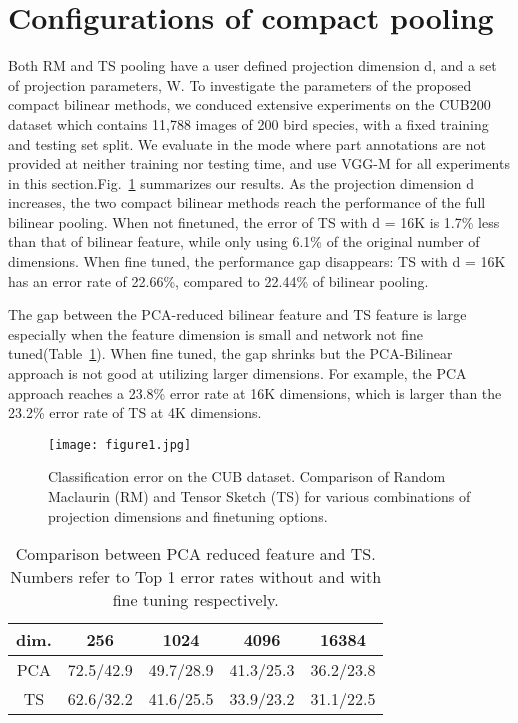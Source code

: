 \documentclass[10pt,twocolumn,letterpaper]{article}
\begin{document}
\section{ Configurations of compact pooling}
Both RM and TS pooling have a user defined projection dimension d, and a set of projection parameters, W. To investigate the parameters of the proposed compact bilinear methods, we conduced extensive experiments on the CUB200 dataset which contains 11,788 images of 200 bird
species, with a fixed training and testing set split. We evaluate in the mode where part annotations are not provided at neither training nor testing time, and use VGG-M for all
experiments in this section.Fig.~\ref{pic1} summarizes our results. As the projection dimension
d increases, the two compact bilinear methods reach the performance of the full bilinear pooling. When not finetuned, the error of TS with d = 16K is 1.7\% less than that of bilinear feature, while only using 6.1\% of the original number of dimensions. When fine tuned, the performance gap
disappears: TS with d = 16K has an error rate of 22.66\%, compared to 22.44\% of bilinear pooling.
\par The gap between the PCA-reduced bilinear feature and TS feature is large especially when the feature dimension is small and network not fine tuned(Table~\ref{table1}). When fine tuned, the gap shrinks but the PCA-Bilinear approach is not good at utilizing larger dimensions. For example, the PCA approach reaches a 23.8\% error rate at 16K dimensions, which is larger than the 23.2\% error rate of TS at 4K dimensions.
\begin{figure}[htp]
	\centering
	\texttt{[image: figure1.jpg]}
	\caption{Classification error on the CUB dataset. Comparison
			of Random Maclaurin (RM) and Tensor Sketch (TS)
			for various combinations of projection dimensions and finetuning
			options.}\label{pic1}
\end{figure}
\begin{table}[h]%
	\centering 
	\caption{ Comparison between PCA reduced feature and TS.
		Numbers refer to Top 1 error rates without and with fine
		tuning respectively.}\label{table1}
	\tabcolsep 0.1in 
	\begin{tabular} {|c|c|c|c|c|}
		\hline
		dim.& 256 &1024 &4096 &16384\\
			\hline
				\hline
		PCA &72.5/42.9& 49.7/28.9& 41.3/25.3 &36.2/23.8\\
			\hline
		TS& 62.6/32.2 &41.6/25.5 &33.9/23.2 &31.1/22.5
\\
			\hline
	\end{tabular}
\end{table}
\end{document}
